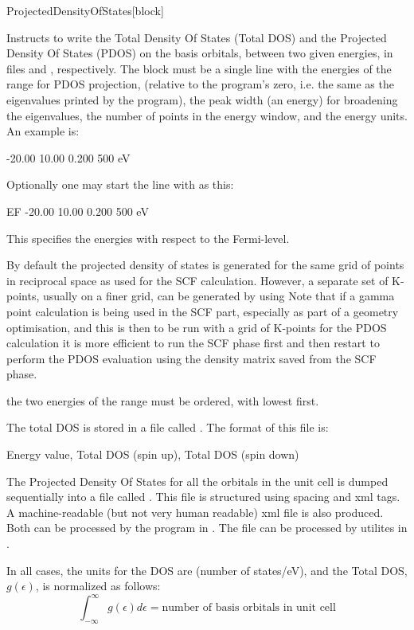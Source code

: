 \begin{fdfentry}{ProjectedDensityOfStates}[block]

  Instructs to write the Total Density Of States (Total DOS) and the
  Projected Density Of States (PDOS) on the basis orbitals, between
  two given energies, in files  and ,
  respectively.  The block must be a single line with the energies of
  the range for PDOS projection, (relative to the program's zero,
  i.e. the same as the eigenvalues printed by the program), the peak
  width (an energy) for broadening the eigenvalues, the number of
  points in the energy window, and the energy units.  An example is:
  \begin{fdfexample}
        -20.00  10.00  0.200  500  eV
  \end{fdfexample}
  Optionally one may start the line with  as this:
  \begin{fdfexample}
        EF -20.00  10.00  0.200  500  eV
  \end{fdfexample}
  This specifies the energies with respect to the Fermi-level.    

  By default the projected density of states is generated for the same
  grid of points in reciprocal space as used for the SCF calculation.
  However, a separate set of K-points, usually on a finer grid, can be
  generated by using  Note that if a gamma point
  calculation is being used in the SCF part, especially as part of a
  geometry optimisation, and this is then to be run with a grid of
  K-points for the PDOS calculation it is more efficient to run the
  SCF phase first and then restart to perform the PDOS evaluation
  using the density matrix saved from the SCF phase.

  \note the two energies of the range must be ordered, with lowest
  first.

  The total DOS is stored in a file called .  The format
  of this file is:
  \begin{shellexample}
   Energy value, Total DOS (spin up), Total DOS (spin down)
  \end{shellexample}

  The Projected Density Of States for all the orbitals in the unit
  cell is dumped sequentially into a file called
  . This file is structured using spacing and
  xml tags. A machine-readable (but not very human readable) xml file
   is also produced. Both can be processed by the
  program in . The  file can be
  processed by utilites in .

  In all cases, the units for the DOS are (number of states/eV), and the
  Total DOS, $g(\epsilon)$, is normalized as follows:
  \begin{equation}
    \int_{-\infty}^\infty g (\epsilon) d\epsilon =
    \text{number of basis orbitals in unit cell}
  \end{equation}

\end{fdfentry}

